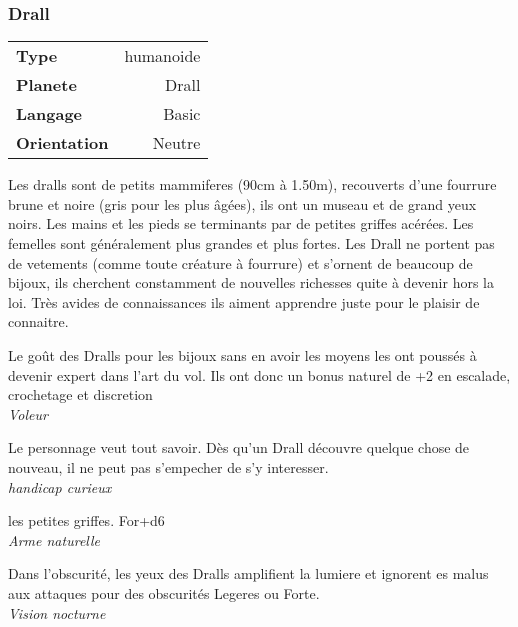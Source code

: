 \subsubsection{Drall} 
	\begin{flushright}	
		\begin{tabular}{|l|r|}
		\textbf{Type} & humanoide \\
		\textbf{Planete} & Drall \\
		\textbf{Langage} & Basic \\
		\textbf{Orientation} & Neutre\\
		\end{tabular}
	\end{flushright}

Les dralls sont de petits mammiferes (90cm à 1.50m), recouverts d'une fourrure brune et noire (gris pour les plus âgées), 
ils ont un museau et de grand yeux noirs. Les mains et les pieds se terminants par de petites griffes acérées. 
Les femelles sont généralement plus grandes et plus fortes. Les Drall ne portent pas de vetements (comme toute créature à fourrure) 
et s'ornent de beaucoup de bijoux, ils cherchent constamment de nouvelles richesses quite à devenir hors la loi. 
Très avides de connaissances ils aiment apprendre juste pour le plaisir de connaitre. \\

\begin{description}[align=left]

 \item[L'or dans les yeux]    %
 	Le goût des Dralls pour les bijoux sans en avoir les moyens les ont poussés à devenir expert dans l'art du vol.
 	Ils ont donc un bonus naturel de +2 en escalade, crochetage et discretion\\
 	\textit{Voleur}
 	
 \item[Mourir moins bête]       %
 	Le personnage veut tout savoir. Dès qu'un Drall découvre quelque chose de nouveau, il ne peut pas s'empecher de s'y interesser.\\
    	\textit{handicap curieux} \\

\item[Griffes retractables]    %
	les petites griffes. For+d6\\
	\textit{Arme naturelle}\\
    
\item[Vision Nocturne]  %
	Dans l'obscurité, les yeux des Dralls amplifient la lumiere et ignorent es malus aux attaques pour des obscurités Legeres ou Forte.\\
	\textit{Vision nocturne}\\

\end{description}

